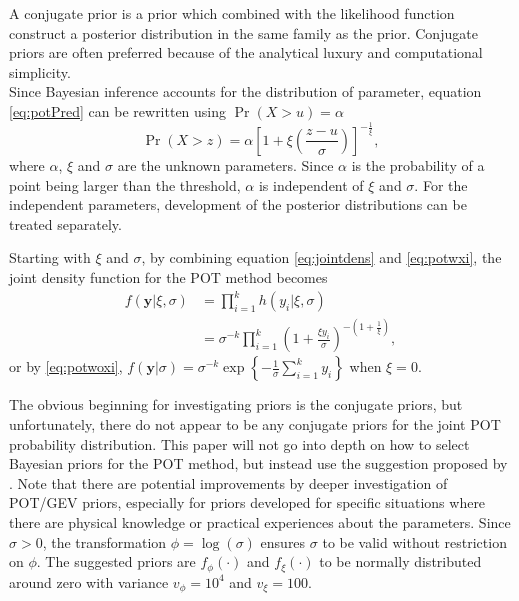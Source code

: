 A conjugate prior is a prior which combined with the likelihood function construct a posterior distribution in the same family as the prior.  Conjugate priors are often preferred because of the analytical luxury and computational simplicity.\\

Since Bayesian inference accounts for the distribution of parameter, equation \eqref{eq:potPred} can be rewritten using $\Pr(X>u)=\alpha$
\begin{equation}
\Pr(X>z)=\alpha \left[1+\xi \left( \frac{z-u}{\sigma}\right)\right]^{-\frac{1}{\xi}},
\end{equation}
where $\alpha$, $\xi$ and $\sigma$ are the unknown parameters. Since $\alpha$ is the probability of a point being larger than the threshold, $\alpha$ is independent of $\xi$ and $\sigma$. For the independent parameters, development of the posterior distributions can be treated separately. 

Starting with $\xi$ and $\sigma$, by combining equation \eqref{eq:jointdens} and \eqref{eq:potwxi}, the joint density function for the POT method becomes
\begin{align}
f(\boldsymbol{y}|\xi,\sigma)&=\prod_{i=1}^{k} h(y_i|\xi,\sigma)\nonumber\\
&=\sigma^{-k} \prod_{i=1}^{k}\left( 1+\frac{\xi y_i}{\sigma}\right)^{-\left(1+\frac{1}{\xi}\right)}, \label{eq:jointdenspot}
\end{align}
or by \eqref{eq:potwoxi}, $f(\boldsymbol{y}|\sigma)=\sigma^{-k}\exp\left\{-\frac{1}{\sigma} \sum_{i=1}^{k}y_i \right\}$ when $\xi=0$. 

The obvious beginning for investigating priors is the conjugate priors, but unfortunately, there do not appear to be any conjugate priors for the joint POT probability distribution. This paper will not go into depth on how to select Bayesian priors for the POT method, but instead use the suggestion proposed by \cite[p.~174]{stuart}. Note that there are potential improvements by deeper investigation of POT/GEV priors, especially for priors developed for specific situations where there are physical knowledge or practical experiences about the parameters. Since $\sigma>0$, the transformation $\phi=\log(\sigma)$ ensures $\sigma$ to be valid without restriction on $\phi$. The suggested priors are $f_{\phi}(\cdot)$ and $f_{\xi}(\cdot)$ to be normally distributed around zero with variance $v_{\phi}=10^4$ and $v_{\xi}=100$. 

